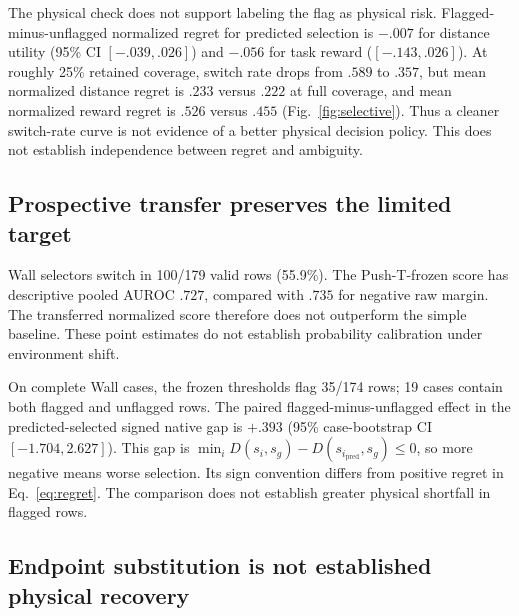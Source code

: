 \documentclass{article}
\begin{document}
The physical check does not support labeling the flag as physical risk.
Flagged-minus-unflagged normalized regret for predicted selection is $-.007$
for distance utility (95\% CI $[-.039,.026]$) and $-.056$ for task reward
($[-.143,.026]$).
At roughly 25\% retained coverage, switch rate drops from $.589$ to $.357$,
but mean normalized distance regret is $.233$ versus $.222$ at full coverage,
and mean normalized reward regret is $.526$ versus $.455$
(Fig.~\ref{fig:selective}). Thus a cleaner
switch-rate curve is not evidence of a better physical decision policy.
This does not establish independence between regret and ambiguity.

\subsection{Prospective transfer preserves the limited target}

Wall selectors switch in 100/179 valid rows (55.9\%). The Push-T-frozen score
has descriptive pooled AUROC $.727$, compared with $.735$ for negative raw
margin. The transferred normalized score therefore does not outperform the
simple baseline. These point estimates do not establish probability calibration
under environment shift.

On complete Wall cases, the frozen thresholds flag 35/174 rows; 19 cases
contain both flagged and unflagged rows. The paired flagged-minus-unflagged
effect in the predicted-selected signed native gap is $+.393$
(95\% case-bootstrap CI $[-1.704,2.627]$). This gap is
$\min_i D(s_i,s_g)-D(s_{i_{\mathrm{pred}}},s_g)\le0$, so more negative means worse selection. Its sign
convention differs from positive regret in Eq.~\ref{eq:regret}. The comparison
does not establish greater physical shortfall in flagged rows.

\subsection{Endpoint substitution is not established physical recovery}
\end{document}
